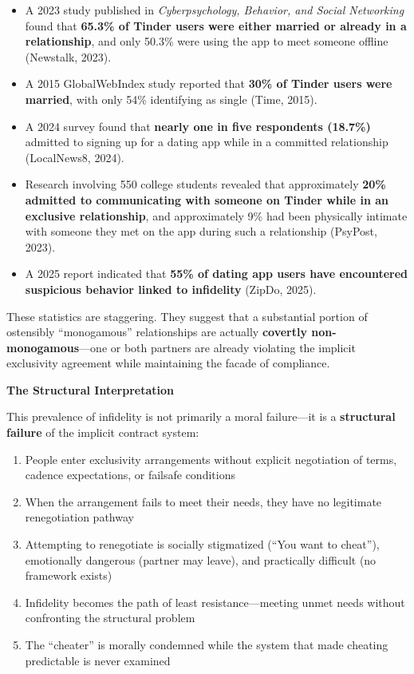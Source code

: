 \documentclass[12pt, letterpaper]{article}
\begin{document}
\begin{itemize}
    \item A 2023 study published in \textit{Cyberpsychology, Behavior, and Social Networking} found that \textbf{65.3\% of Tinder users were either married or already in a relationship}, and only 50.3\% were using the app to meet someone offline (Newstalk, 2023).
    
    \item A 2015 GlobalWebIndex study reported that \textbf{30\% of Tinder users were married}, with only 54\% identifying as single (Time, 2015).
    
    \item A 2024 survey found that \textbf{nearly one in five respondents (18.7\%)} admitted to signing up for a dating app while in a committed relationship (LocalNews8, 2024).
    
    \item Research involving 550 college students revealed that approximately \textbf{20\% admitted to communicating with someone on Tinder while in an exclusive relationship}, and approximately 9\% had been physically intimate with someone they met on the app during such a relationship (PsyPost, 2023).
    
    \item A 2025 report indicated that \textbf{55\% of dating app users have encountered suspicious behavior linked to infidelity} (ZipDo, 2025).
\end{itemize}

These statistics are staggering. They suggest that a substantial portion of ostensibly ``monogamous'' relationships are actually \textbf{covertly non-monogamous}---one or both partners are already violating the implicit exclusivity agreement while maintaining the facade of compliance.

\textbf{The Structural Interpretation}

This prevalence of infidelity is not primarily a moral failure---it is a \textbf{structural failure} of the implicit contract system:

\begin{enumerate}
    \item People enter exclusivity arrangements without explicit negotiation of terms, cadence expectations, or failsafe conditions
    \item When the arrangement fails to meet their needs, they have no legitimate renegotiation pathway
    \item Attempting to renegotiate is socially stigmatized (``You want to cheat''), emotionally dangerous (partner may leave), and practically difficult (no framework exists)
    \item Infidelity becomes the path of least resistance---meeting unmet needs without confronting the structural problem
    \item The ``cheater'' is morally condemned while the system that made cheating predictable is never examined
\end{enumerate}
\end{document}
